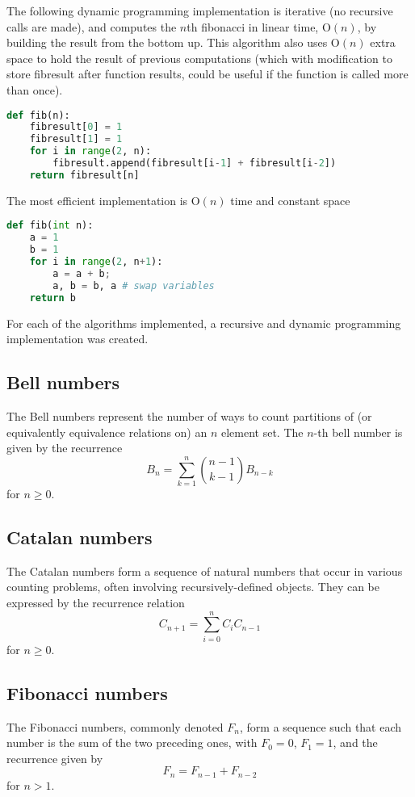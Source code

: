 \documentclass{article}
\begin{document}
The following dynamic programming implementation is iterative (no recursive calls are made), and computes the $n$th fibonacci in linear time, O$(n)$, by building the result from the bottom up. This algorithm also uses O$(n)$ extra space to hold the result of previous computations (which with modification to store fibresult after function results, could be useful if the function is called more than once).

\begin{lstlisting}[language=Python]
def fib(n):
    fibresult[0] = 1
    fibresult[1] = 1
    for i in range(2, n):
        fibresult.append(fibresult[i-1] + fibresult[i-2])
    return fibresult[n]
\end{lstlisting}

The most efficient implementation is O$(n)$ time and constant space

\begin{lstlisting}[language=Python]
def fib(int n):
    a = 1
    b = 1
    for i in range(2, n+1):
        a = a + b;
        a, b = b, a # swap variables
    return b
\end{lstlisting}

For each of the algorithms implemented, a recursive and dynamic programming implementation was created.

\label{section:bell}
\subsection{Bell numbers}
The Bell numbers represent the number of ways to count partitions of (or equivalently equivalence relations on) an $n$ element set. The $n$-th bell number is given by the recurrence
\[B_n = \sum_{k=1}^{n} {n-1 \choose k-1} B_{n-k}\]
for $n \ge 0$.
\subsection{Catalan numbers}
The Catalan numbers form a sequence of natural numbers that occur in various counting problems, often involving recursively-defined objects. They can be expressed by the recurrence relation
\[C_{n+1} = \sum_{i=0}^{n}C_iC_{n-1}\]
for $n \ge 0$.

\subsection{Fibonacci numbers}
\label{subsection:fib}
The Fibonacci numbers, commonly denoted $F_n$, form a sequence such that each number is the sum of the two preceding ones, with $F_0 = 0$, $F_1 = 1$, and the recurrence given by
\[F_n = F_{n-1}+F_{n-2}\]
for $n > 1$.
\end{document}
